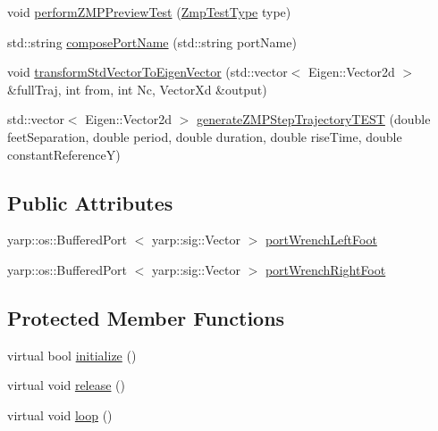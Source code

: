 \begin{DoxyCompactItemize}
\item 
void \hyperlink{classWalkingClient_a3b1217b7fa17f76f162be0e12e419d96}{perform\-Z\-M\-P\-Preview\-Test} (\hyperlink{WalkingClient_8h_afc01479a47f5a87462a54b6a9e11fffa}{\-Zmp\-Test\-Type} type)
\item 
std\-::string \hyperlink{classWalkingClient_ae8f7dc629313df7d362e3edd6f45ae10}{compose\-Port\-Name} (std\-::string port\-Name)
\item 
void \hyperlink{classWalkingClient_ab4148804702e065310a903112bc10162}{transform\-Std\-Vector\-To\-Eigen\-Vector} (std\-::vector$<$ \-Eigen\-::\-Vector2d $>$ \&full\-Traj, int from, int \-Nc, \-Vector\-Xd \&output)
\item 
std\-::vector$<$ \-Eigen\-::\-Vector2d $>$ \hyperlink{classWalkingClient_a70b2375134ae55a041fbf30180ea3a8f}{generate\-Z\-M\-P\-Step\-Trajectory\-T\-E\-S\-T} (double feet\-Separation, double period, double duration, double rise\-Time, double constant\-Reference\-Y)
\end{DoxyCompactItemize}
\subsection*{\-Public \-Attributes}
\begin{DoxyCompactItemize}
\item 
yarp\-::os\-::\-Buffered\-Port\*
$<$ yarp\-::sig\-::\-Vector $>$ \hyperlink{classWalkingClient_a88ee63ff6a341eccd458d24700383457}{port\-Wrench\-Left\-Foot}
\item 
yarp\-::os\-::\-Buffered\-Port\*
$<$ yarp\-::sig\-::\-Vector $>$ \hyperlink{classWalkingClient_a96321dc60e84c193f2dea6e85983ca67}{port\-Wrench\-Right\-Foot}
\end{DoxyCompactItemize}
\subsection*{\-Protected \-Member \-Functions}
\begin{DoxyCompactItemize}
\item 
virtual bool \hyperlink{classWalkingClient_aba6a03fe29a4e947bc6bc0c09a713b2a}{initialize} ()
\item 
virtual void \hyperlink{classWalkingClient_a3b36da9d7649865a13c9318dd73ebc7e}{release} ()
\item 
virtual void \hyperlink{classWalkingClient_afd997bb00534c57fe1b0d5f37f207386}{loop} ()
\end{DoxyCompactItemize}
